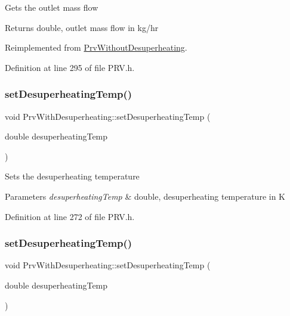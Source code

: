 Gets the outlet mass flow \begin{DoxyReturn}{Returns}
double, outlet mass flow in kg/hr 
\end{DoxyReturn}


Reimplemented from \hyperlink{class_prv_without_desuperheating_aefe4227f2c01209ba4ce79f6b5825d73}{Prv\+Without\+Desuperheating}.



Definition at line 295 of file P\+R\+V.\+h.

\mbox{\label{class_prv_with_desuperheating_ade1b153c495efb451006b3c054ff386e}} 
\subsubsection{\texorpdfstring{set\+Desuperheating\+Temp()}{setDesuperheatingTemp()}\hspace{0.1cm}{\footnotesize\ttfamily [1/3]}}
{\footnotesize\ttfamily void Prv\+With\+Desuperheating\+::set\+Desuperheating\+Temp (\begin{DoxyParamCaption}\item[{double}]{desuperheating\+Temp }\end{DoxyParamCaption})\hspace{0.3cm}{\ttfamily [inline]}}

Sets the desuperheating temperature


\begin{DoxyParams}{Parameters}
{\em desuperheating\+Temp} & double, desuperheating temperature in K \\
\hline
\end{DoxyParams}


Definition at line 272 of file P\+R\+V.\+h.

\mbox{\label{class_prv_with_desuperheating_ade1b153c495efb451006b3c054ff386e}} 
\subsubsection{\texorpdfstring{set\+Desuperheating\+Temp()}{setDesuperheatingTemp()}\hspace{0.1cm}{\footnotesize\ttfamily [2/3]}}
{\footnotesize\ttfamily void Prv\+With\+Desuperheating\+::set\+Desuperheating\+Temp (\begin{DoxyParamCaption}\item[{double}]{desuperheating\+Temp }\end{DoxyParamCaption})\hspace{0.3cm}{\ttfamily [inline]}}

